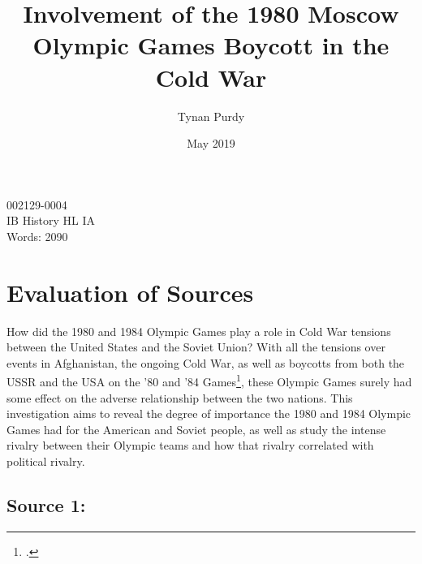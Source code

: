 \documentclass[12pt,letterpaper]{article}
\title{Involvement of the 1980 Moscow Olympic Games Boycott in the Cold War}
\author{Tynan Purdy}
\date{May 2019}
\begin{document}
\large
\parindent=0.5in

{\fontsize{12}{14.4}
	{\singlespace
	    \maketitle
	    \begin{center}
	    002129-0004 \\
	    \vspace{4mm}
	    IB History HL IA \\
	    \vspace{4mm}
	    Words: 2090 \\ %
	\end{center}
	}
}	

\newpage
\tableofcontents
{}
\newpage

\section{Evaluation of Sources}

How did the 1980 and 1984 Olympic Games play a role in Cold War tensions between the United States and the Soviet Union? With all the tensions over events in Afghanistan, the ongoing Cold War, as well as boycotts from both the USSR and the USA on the '80 and '84 Games\footcite[559]{guttmann_cold_1988}, these Olympic Games surely had some effect on the adverse relationship between the two nations. This investigation aims to reveal the degree of importance the 1980 and 1984 Olympic Games had for the American and Soviet people, as well as study the intense rivalry between their Olympic teams and how that rivalry correlated with political rivalry.

\subsection{Source 1: }
\end{document}
